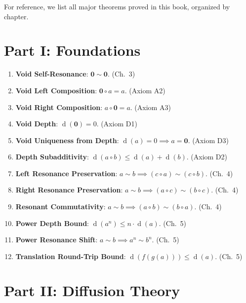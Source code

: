 \documentclass[11pt,openany]{book}
\theoremstyle{definition}
\theoremstyle{plain}
\theoremstyle{remark}
\newcommand{\compose}{\circ}                 %
\newcommand{\void}{\mathbf{0}}              %
\newcommand{\res}{\sim}                      %
\newcommand{\depth}{\operatorname{d}}       %
\begin{document}
For reference, we list all major theorems proved in this book, organized by chapter.

\section{Part I: Foundations}

\begin{enumerate}
\item \textbf{Void Self-Resonance}: $\void \res \void$. (Ch.~3)
\item \textbf{Void Left Composition}: $\void \compose a = a$. (Axiom A2)
\item \textbf{Void Right Composition}: $a \compose \void = a$. (Axiom A3)
\item \textbf{Void Depth}: $\depth(\void) = 0$. (Axiom D1)
\item \textbf{Void Uniqueness from Depth}: $\depth(a) = 0 \implies a = \void$. (Axiom D3)
\item \textbf{Depth Subadditivity}: $\depth(a \compose b) \leq \depth(a) + \depth(b)$. (Axiom D2)
\item \textbf{Left Resonance Preservation}: $a \res b \implies (c \compose a) \res (c \compose b)$. (Ch.~4)
\item \textbf{Right Resonance Preservation}: $a \res b \implies (a \compose c) \res (b \compose c)$. (Ch.~4)
\item \textbf{Resonant Commutativity}: $a \res b \implies (a \compose b) \res (b \compose a)$. (Ch.~4)
\item \textbf{Power Depth Bound}: $\depth(a^n) \leq n \cdot \depth(a)$. (Ch.~5)
\item \textbf{Power Resonance Shift}: $a \res b \implies a^n \res b^n$. (Ch.~5)
\item \textbf{Translation Round-Trip Bound}: $\depth(f(g(a))) \leq \depth(a)$. (Ch.~5)
\end{enumerate}

\section{Part II: Diffusion Theory}
\end{document}
